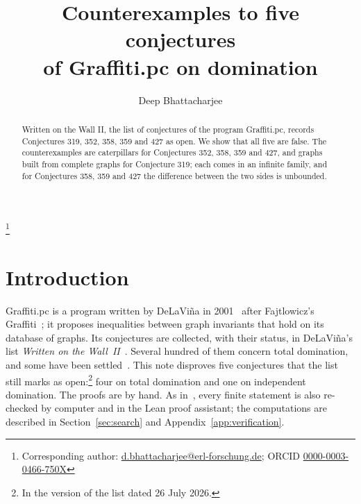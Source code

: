 \documentclass[11pt]{amsart}
\theoremstyle{definition}
\theoremstyle{remark}
\numberwithin{equation}{section}
\begin{document}
\title[Five conjectures of Graffiti.pc on domination]{Counterexamples to five conjectures\\ of Graffiti.pc on domination}

\author{Deep Bhattacharjee}
\address{Formerly, Electro-Gravitational Space Propulsion Laboratory (EGSPL),\newline Bhubaneswar, Odisha 751030, India}
\thanks{Corresponding author: \href{mailto:d.bhattacharjee@erl-forschung.de}{d.bhattacharjee@erl-forschung.de}; ORCID \href{https://orcid.org/0000-0003-0466-750X}{\mbox{0000-0003-0466-750X}}}


\begin{abstract}
Written on the Wall II, the list of conjectures of the program Graffiti.pc, records Conjectures 319, 352, 358, 359 and 427 as open. We show that all five are false. The counterexamples are caterpillars for Conjectures 352, 358, 359 and 427, and graphs built from complete graphs for Conjecture 319; each comes in an infinite family, and for Conjectures 358, 359 and 427 the difference between the two sides is unbounded.
\end{abstract}

\maketitle

\section{Introduction}

Graffiti.pc is a program written by DeLaVi\~na in 2001~\cite{DeLaVina2005a} after Fajtlowicz's Graffiti~\cite{Fajtlowicz1988}; it proposes inequalities between graph invariants that hold on its database of graphs. Its conjectures are collected, with their status, in DeLaVi\~na's list \emph{Written on the Wall~II}~\cite{WOWII}. Several hundred of them concern total domination, and some have been settled~\cite{DLPWW2007,DLPW2009,DesormeauxHenning2016}. This note disproves five conjectures that the list still marks as open:\footnote{In the version of the list dated 26 July 2026.} four on total domination and one on independent domination. The proofs are by hand. As in~\cite{BMB2026}, every finite statement is also re-checked by computer and in the Lean proof assistant; the computations are described in Section~\ref{sec:search} and Appendix~\ref{app:verification}.
\end{document}
